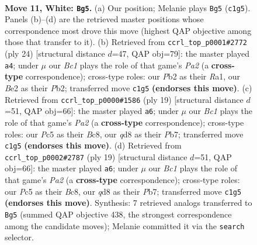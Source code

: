 \documentclass[11pt]{article}
\begin{document}
\clearpage

\begin{figure}[p]\centering
\begin{subfigure}{0.46\textwidth}\centering
\resizebox{\linewidth}{!}{%
\newchessgame
\chessboard[
  setfen={r2q1rk1/1p1bbppp/p1n1pn2/2Pp4/3P4/P1N2N2/1P2BPPP/R1BQ1RK1 w - - 0 11},
  showmover=false,
  pgfstyle=straightmove, color=movearrow, markmove={c1-g5}
]}
\caption{}
\end{subfigure}\hfill
\begin{subfigure}{0.46\textwidth}\centering
\resizebox{\linewidth}{!}{%
\newchessgame
\chessboard[
  setfen={r2q1rk1/pb2bppp/1pn2n2/3p4/2pP1B2/2N1PN1P/PP2BPP1/R2Q1RK1 w - - 2 13},
  showmover=false,
  pgfstyle=straightmove, color=movearrow, markmove={a2-a4}
]}
\caption{}
\end{subfigure}
\\[4pt]
\begin{subfigure}{0.46\textwidth}\centering
\resizebox{\linewidth}{!}{%
\newchessgame
\chessboard[
  setfen={r1bq1rk1/pp2bppp/2n2n2/3p4/2pP1B2/2N1P3/PPB1NPPP/R2Q1RK1 b - - 1 10},
  showmover=false,
  pgfstyle=straightmove, color=movearrow, markmove={a7-a6}
]}
\caption{}
\end{subfigure}\hfill
\begin{subfigure}{0.46\textwidth}\centering
\resizebox{\linewidth}{!}{%
\newchessgame
\chessboard[
  setfen={r1bq1rk1/pp2bppp/2n2n2/3p4/2pP1B2/2N1P3/PPB1NPPP/R2Q1RK1 b - - 1 10},
  showmover=false,
  pgfstyle=straightmove, color=movearrow, markmove={a7-a6}
]}
\caption{}
\end{subfigure}
\caption{\textbf{Move 11, White: \texttt{Bg5}.} (a) Our position; Melanie plays \texttt{Bg5} (\texttt{c1g5}). Panels (b)--(d) are the retrieved master positions whose correspondence most drove this move (highest QAP objective among those that transfer to it). (b) Retrieved from \texttt{ccrl\_top\_p0001\#2772} (ply 24) [structural distance $d$=47, QAP obj=79]: the master played \texttt{a4}; under $\mu$ our \emph{Bc1} plays the role of that game's \emph{Pa2} (a \textbf{cross-type} correspondence); cross-type roles: our \emph{P}b2 as their \emph{R}a1, our \emph{B}e2 as their \emph{P}b2; transferred move \texttt{c1g5} \textbf{(endorses this move)}. (c) Retrieved from \texttt{ccrl\_top\_p0000\#1586} (ply 19) [structural distance $d$=51, QAP obj=66]: the master played \texttt{a6}; under $\mu$ our \emph{Bc1} plays the role of that game's \emph{Pa2} (a \textbf{cross-type} correspondence); cross-type roles: our \emph{P}c5 as their \emph{B}c8, our \emph{q}d8 as their \emph{P}b7; transferred move \texttt{c1g5} \textbf{(endorses this move)}. (d) Retrieved from \texttt{ccrl\_top\_p0002\#2787} (ply 19) [structural distance $d$=51, QAP obj=66]: the master played \texttt{a6}; under $\mu$ our \emph{Bc1} plays the role of that game's \emph{Pa2} (a \textbf{cross-type} correspondence); cross-type roles: our \emph{P}c5 as their \emph{B}c8, our \emph{q}d8 as their \emph{P}b7; transferred move \texttt{c1g5} \textbf{(endorses this move)}. Synthesis: 7 retrieved analogs transferred to \texttt{Bg5} (summed QAP objective 438, the strongest correspondence among the candidate moves); Melanie committed it via the \texttt{search} selector.}

\end{figure}
\end{document}
